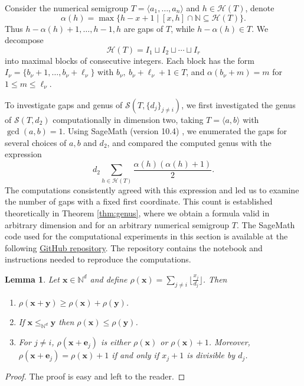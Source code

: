 \documentclass[12pt]{amsart}
\theoremstyle{plain}
\theoremstyle{theorem}
\newtheorem{lemma}[definition]{Lemma}
\theoremstyle{remark}
\begin{document}
Consider the numerical semigroup $T=\langle a_1, \ldots, a_n\rangle$ and $h\in \mathcal{H}(T)$, denote 
$$\alpha(h)=\max\{h-x+1\mid [x,h]\cap \mathbb{N}\subseteq \mathcal{H}(T)\}.$$
Thus $h-\alpha(h)+1,\dots,h-1,h$ are gaps of $T$, while $h-\alpha(h)\in T$. We decompose
$$\mathcal{H}(T)=I_1\sqcup I_2\sqcup\cdots\sqcup I_r$$
into maximal blocks of consecutive integers. Each block has the form $I_\nu=\{b_\nu+1,\dots,b_\nu+\ell_\nu\}$ with $b_\nu,\ b_\nu+\ell_\nu+1\in T$, and $\alpha(b_\nu+m)=m$ for $1\le m\le\ell_\nu$. 


To investigate gaps and genus of $\mathcal{S}(T,\{d_j\}_{j \neq i})$, we first investigated the genus of $\mathcal{S}(T,d_2)$ computationally in dimension two, taking $T=\langle a,b\rangle$ with $\gcd(a,b)=1$.
Using SageMath (version 10.4) \cite{sagemath}, we enumerated the gaps for several choices of $a,b$ and $d_2$, and compared the computed genus with the expression
\[
d_2\sum_{h\in \mathcal{H}(T)}\frac{\alpha(h)(\alpha(h)+1)}{2}.
\]
The computations consistently agreed with this expression and led us to examine the number of gaps with a fixed first coordinate. 
This count is established theoretically in Theorem \ref{thm:genus}, where we obtain a formula valid in arbitrary dimension and for an arbitrary numerical semigroup \(T\).
The SageMath code used for the computational experiments in this section is available at the following \href{https://github.com/priyavratd/gapsandwilf/}{GitHub repository}.  
The repository contains the notebook and instructions needed to reproduce the computations.

\begin{lemma}\label{lem:rhoproperties}
    Let $\mathbf{x} \in \mathbb{N}^d$ and define $\rho(\mathbf{x}) = \sum_{j \neq i} \lfloor \frac{x_j}{d_j} \rfloor$. Then
    \begin{enumerate}
        \item $\rho(\mathbf{x} + \mathbf{y}) \geq \rho(\mathbf{x}) + \rho(\mathbf{y})$.

        \item If $\mathbf{x} \leq_{\mathbb{N}^d} \mathbf{y}$ then $\rho(\mathbf{x}) \leq \rho(\mathbf{y})$.

        \item For $j \neq i$, $\rho(\mathbf{x} + \mathbf{e}_j)$ is either $\rho(\mathbf{x})$ or $\rho(\mathbf{x})+1$. Moreover, $\rho(\mathbf{x} + \mathbf{e}_j) = \rho(\mathbf{x})+1$ if and only if $x_j+1$ is divisible by $d_j$.
    \end{enumerate}
\end{lemma}
\begin{proof}
    The proof is easy and left to the reader.
\end{proof}
\end{document}
